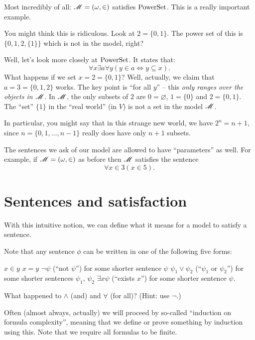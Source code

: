 \begin{example}
	Most incredibly of all: $\mathscr M = (\omega, \in)$ satisfies $\mathrm{PowerSet}$.
	This is a really important example.
	
	You might think this is ridiculous. Look at $2 = \{0,1\}$.
	The power set of this is $\{0, 1, 2, \{1\}\}$ which is not in the model, right?

	Well, let's look more closely at $\mathrm{PowerSet}$. It states that:
	\[ \forall x \exists a \forall y (y \in a \iff y \subseteq x). \]
	What happens if we set $x = 2 = \{0,1\}$?
	Well, actually, we claim that $a = 3 = \{0,1,2\}$ works.
	The key point is ``for all $y$'' -- this \emph{only ranges over the objects in $\mathscr M$}.
	In $\mathscr M$, the only subsets of $2$ are $0 = \varnothing$,
	$1 = \{0\}$ and $2 = \{0,1\}$.
	The ``set'' $\{1\}$ in the ``real world'' (in $V$) is not a set in the model $\mathscr M$.

	In particular, you might say that in this strange new world,
	we have $2^n = n+1$, since $n = \{0,1,\dots,n-1\}$ really does
	have only $n+1$ subsets.
\end{example}

\begin{example}
	The sentences we ask of our model are allowed to have ``parameters'' as well.
	For example, if $\mathscr M = (\omega, \in)$ as before then $\mathscr M$ satisfies the sentence
	\[ \forall x \in 3 (x \in 5). \]
\end{example}

\section{Sentences and satisfaction}
With this intuitive notion, we can define what it means for a model to satisfy a sentence.
\begin{definition}
Note that any sentence $\phi$ can be written in one of the following five forms:
\begin{itemize}
	\ii $x \in y$
	\ii $x = y$
	\ii $\neg \psi$ (``not $\psi$'') for some shorter sentence $\psi$
	\ii $\psi_1 \lor \psi_2$ (``$\psi_1$ or $\psi_2$'')
	for some shorter sentences $\psi_1$, $\psi_2$
	\ii $\exists x \psi$ (``exists $x$'') for some shorter sentence $\psi$.
\end{itemize}
\end{definition}
\begin{ques}
	What happened to $\land$ (and) and $\forall$ (for all)?
	(Hint: use $\neg$.)
\end{ques}
Often (almost always, actually) we will proceed by so-called ``induction on formula complexity'',
meaning that we define or prove something by induction using this.
Note that we require all formulas to be finite.

